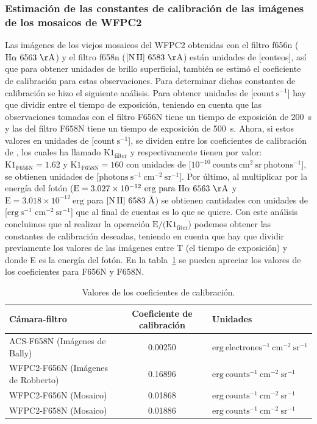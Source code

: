 \subsubsection{Estimación de las  constantes de calibración de las imágenes de los mosaicos de WFPC2}
\label{sec:wpfc2}
Las imágenes de los viejos mosaicos del WFPC2  obtenidas con el filtro f656n (\(\mathrm{\ha~6563~\AA{}}\)) y el filtro f658n (\(\mathrm{\nii~6583~\AA{}}\)) están unidades de [conteos], así que para obtener unidades de brillo superficial, también se estimó el coeficiente de calibración para estas observaciones. Para determinar dichas constantes de calibración se hizo el siguiente análisis. Para obtener unidades de [\(\mathrm{count~s^{-1}}\)] hay que  dividir entre el tiempo de exposición, teniendo en cuenta que las observaciones tomadas con el filtro F656N tiene un tiempo de exposición de 200~s y las del filtro F658N tiene un tiempo de exposición de 500~s. Ahora, si estos valores en unidades de [\(\mathrm{count~s^{-1}}\)], se dividen entre los coeficientes de calibración de \citet{Odell:2009}, los cuales ha llamado \(\mathrm{K1_{filter}}\) y respectivamente tienen por valor: \(\mathrm{K1_{F656N} = 1.62}\) y \(\mathrm{K1_{F658N} = 160}\) con unidades de [\(\mathrm{10^{-10}~counts~cm^{2}~sr~photons^{-1}}\)], se obtienen unidades de [\(\mathrm{photons~s^{-1}~cm^{-2}~sr^{-1}}\)]. Por último, al multiplicar por la energía del fotón (\(\mathrm{E=3.027\times 10^{-12}~erg~para~\ha{}~6563~\AA{}}\) y \(\mathrm{E=3.018 \times10^{-12}~erg}\) para \(\mathrm{[N\,II]}{}~6583~\text{\AA{}}{}\)) se obtienen cantidades con unidades de [\(\mathrm{erg~s^{-1}}\)  \(\mathrm{cm^{-2}~sr^{-1}}\)] que al final de cuentas es lo que se quiere.  Con este análisis concluimos que al realizar la operación \(\text{E}/(\mathrm{K1_{fiter}}\))  podemos obtener las constantes de calibración deseadas, teniendo en cuenta que hay que dividir previamente los valores de las imágenes entre T (el tiempo de exposición) y donde E es la energía del fotón. En la tabla~\ref{tab:table-constans} se pueden apreciar los valores de los coeficientes para F656N y F658N.


\begin{table}[!hb]
\centering
\small\raggedright
\renewcommand{\arraystretch}{1.7}
\caption{Valores de los coeficientes de calibración.}
  \label{tab:table-constans}
\setlength\tabcolsep{2.3pt}
\begin{tabular}{ |l| |c| |l| }
\hline
Cámara-filtro&                       Coeficiente de calibración&       Unidades\\ \hline 
ACS-F658N (Imágenes de Bally)&       0.00250 &                          \(\mathrm{erg~electrones^{-1}~cm^{-2}~sr^{-1}}\)\\
WFPC2-F656N (Imágenes de Robberto)&  0.16896 &                          \(\mathrm{erg~counts^{-1}~cm^{-2}~sr^{-1}}\)\\
WFPC2-F656N (Mosaico)&               0.01868 &                          \(\mathrm{erg~counts^{-1}~cm^{-2}~sr^{-1}}\)\\
WFPC2-F658N (Mosaico)&               0.01886 &                          \(\mathrm{erg~counts^{-1}~cm^{-2}~sr^{-1}}\)\\ 
\hline
 \end{tabular}
 \end{table}
\normalsize

